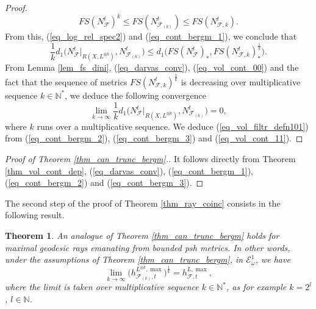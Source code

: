 \documentclass[12pt]{article}
\numberwithin{equation}{section}
\theoremstyle{theorem}
\newtheorem{thm}{Theorem}[section]
\theoremstyle{definition}
\theoremstyle{remark}
\newcommand{\nat}{\mathbb{N}}
\begin{document}
\begin{proof}
\begin{equation}
			FS(N^t_{\mathcal{F}})^k \leq FS(N^t_{\mathcal{F}_{(k)}}) \leq FS(N^t_{\mathcal{F}, k}).
		\end{equation}
		From this, (\ref{eq_log_rel_spec2}) and (\ref{eq_cont_bergm_1}), we conclude that 
		\begin{equation}\label{eq_vol_cont_00}
			\frac{1}{k}
			d_1 \big( N^t_{\mathcal{F}}|_{R(X, L^{\otimes k})}, N^t_{\mathcal{F}_{(k)}} \big)
			\leq
			d_1 \big( FS(N^t_{\mathcal{F}})_*, FS(N^t_{\mathcal{F}, k})_*^{\frac{1}{k}} \big).
		\end{equation}
		From Lemma \ref{lem_fs_dini}, (\ref{eq_darvas_conv}), (\ref{eq_vol_cont_00}) and the fact that the sequence of metrics $FS(N^t_{\mathcal{F}, k})^{\frac{1}{k}}$ is decreasing over multiplicative sequence $k \in \nat^*$, we deduce the following convergence
		\begin{equation}\label{eq_vol_cont_11}
			\lim_{k \to \infty} \frac{1}{k}
			d_1 \big( N^t_{\mathcal{F}}|_{R(X, L^{\otimes k})}, N^t_{\mathcal{F}_{(k)}} \big)
			=
			0,
		\end{equation}		 
		where $k$ runs over a multiplicative sequence.
		We deduce (\ref{eq_vol_filtr_defn101}) from (\ref{eq_cont_bergm_2}), (\ref{eq_cont_bergm_3}) and (\ref{eq_vol_cont_11}).
	\end{proof}
	\begin{proof}[Proof of Theorem \ref{thm_can_trunc_bergm}.]
		It follows directly from Theorem \ref{thm_vol_cont_dep}, (\ref{eq_darvas_conv}), (\ref{eq_cont_bergm_1}), (\ref{eq_cont_bergm_2}) and (\ref{eq_cont_bergm_3}).
	\end{proof}
	The second step of the proof of Theorem \ref{thm_ray_coinc} consists in the following result.
	\begin{thm}\label{thm_max_can_appr}
		An analogue of Theorem \ref{thm_can_trunc_bergm} holds for maximal geodesic rays emanating from bounded psh metrics.
		In other words, under the assumptions of Theorem \ref{thm_can_trunc_bergm}, in $\mathcal{E}_{\omega}^1$, we have
		\begin{equation}
			\lim_{k \to \infty} \big( h^{L^{\otimes k}, \max}_{\mathcal{F}_{(k)}, t} \big)^{\frac{1}{k}} = h^{L, \max}_{\mathcal{F}, t},
		\end{equation}
		where the limit is taken over multiplicative sequence $k \in \nat^*$, as for example $k = 2^l$, $l \in \nat$.
	\end{thm}
\end{document}
